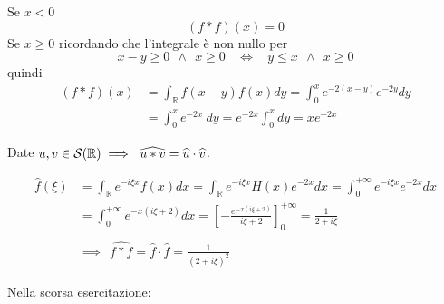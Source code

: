 Se $x< 0$
\begin{equation*}
( f*f)( x) =0
\end{equation*}
Se $x\geqslant 0$ ricordando che l'integrale è non nullo per 
\begin{equation*}
x-y\geqslant 0\ \ \land \ \ x\geqslant 0\ \ \ \ \iff \ \ \ \ y\leqslant x\ \ \land \ \ x\geqslant 0
\end{equation*}
quindi
\begin{align*}
( f*f)( x) & =\int _{\mathbb{R}} f( x-y) f( x) dy=\int ^{x}_{0} e^{-2( x-y)} e^{-2y} dy\\
 & =\int ^{x}_{0} e^{-2x} \ dy=e^{-2x}\int ^{x}_{0} dy=xe^{-2x}
\end{align*}
\begin{thm}
Date $\displaystyle u,v\in \mathcal{S} (\mathbb{R}) \implies \ \widehat{u*v} =\widehat{u} \cdot \widehat{v}$.
\end{thm}
\begin{align*}
\hat{f}( \xi ) & =\int _{\mathbb{R}} e^{-i\xi x} f( x) dx=\int _{\mathbb{R}} e^{-i\xi x} H( x) e^{-2x} dx=\int ^{+\infty }_{0} e^{-i\xi x} e^{-2x} dx\\
 & =\int ^{+\infty }_{0} e^{-x( i\xi +2)} dx=\left[ -\frac{e^{-x( i\xi +2)}}{i\xi +2}\right]^{+\infty }_{0} =\frac{1}{2+i\xi }\\
 & \\
 & \implies \ \ \widehat{f*f} =\hat{f} \cdot \hat{f} =\frac{1}{( 2+i\xi )^{2}}
\end{align*}
\Soluzione

Nella scorsa esercitazione:

